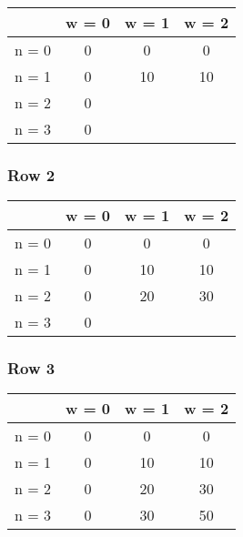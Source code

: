 \begin{table}[H]
	\centering
	\begin{tabular}{| c | c | c | c |}
		\hline
				&	w = 0	&	w = 1	&	w = 2\\
		\hline
		n = 0	&	0		&	0	&	0\\
		\hline
		n = 1	&	0		&	10	&	10\\
		\hline
		n = 2	&	0		&		&	\\
		\hline
		n = 3	&	0		&		&	\\
		\hline
	\end{tabular}
\end{table}

\subsubsection*{Row 2}

\begin{table}[H]
	\centering
	\begin{tabular}{| c | c | c | c |}
		\hline
		&	w = 0	&	w = 1	&	w = 2\\
		\hline
		n = 0	&	0		&	0	&	0\\
		\hline
		n = 1	&	0		&	10	&	10\\
		\hline
		n = 2	&	0		&	20	&	30\\
		\hline
		n = 3	&	0		&		&	\\
		\hline
	\end{tabular}
\end{table}

\subsubsection*{Row 3}

\begin{table}[H]
	\centering
	\begin{tabular}{| c | c | c | c |}
		\hline
		&	w = 0	&	w = 1	&	w = 2\\
		\hline
		n = 0	&	0		&	0	&	0\\
		\hline
		n = 1	&	0		&	10	&	10\\
		\hline
		n = 2	&	0		&	20	&	30\\
		\hline
		n = 3	&	0		&	30	&	50\\
		\hline
	\end{tabular}
\end{table}
